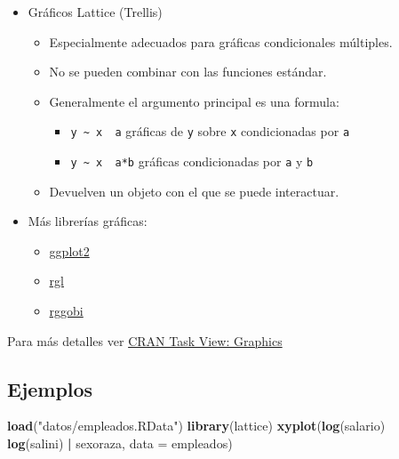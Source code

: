 \documentclass[]{book}
\newenvironment{Shaded}{\begin{snugshade}}{\end{snugshade}}
\newcommand{\DataTypeTok}[1]{\textcolor[rgb]{0.13,0.29,0.53}{#1}}
\newcommand{\KeywordTok}[1]{\textcolor[rgb]{0.13,0.29,0.53}{\textbf{#1}}}
\newcommand{\NormalTok}[1]{#1}
\newcommand{\OperatorTok}[1]{\textcolor[rgb]{0.81,0.36,0.00}{\textbf{#1}}}
\newcommand{\StringTok}[1]{\textcolor[rgb]{0.31,0.60,0.02}{#1}}
\begin{document}
\begin{itemize}
\item
  Gráficos Lattice (Trellis)

  \begin{itemize}
  \item
    Especialmente adecuados para gráficas condicionales múltiples.
  \item
    No se pueden combinar con las funciones estándar.
  \item
    Generalmente el argumento principal es una formula:

    \begin{itemize}
    \item
      \texttt{y\ \textasciitilde{}\ x\ \textbar{}\ a} gráficas de \texttt{y} sobre \texttt{x} condicionadas por \texttt{a}
    \item
      \texttt{y\ \textasciitilde{}\ x\ \textbar{}\ a*b} gráficas condicionadas por \texttt{a} y \texttt{b}
    \end{itemize}
  \item
    Devuelven un objeto con el que se puede interactuar.
  \end{itemize}
\item
  Más librerías gráficas:

  \begin{itemize}
  \item
    \href{http://had.co.nz/ggplot2}{ggplot2}
  \item
    \href{http://rgl.neoscientists.org}{rgl}
  \item
    \href{http://www.ggobi.org/rggobi}{rggobi}
  \end{itemize}
\end{itemize}

Para más detalles ver \href{http://cran.r-project.org/web/views/Graphics.html}{CRAN Task View: Graphics}

\hypertarget{ejemplos-2}{%
\subsection{Ejemplos}\label{ejemplos-2}}

\begin{Shaded}
\begin{Highlighting}[]
\KeywordTok{load}\NormalTok{(}\StringTok{"datos/empleados.RData"}\NormalTok{)}
\KeywordTok{library}\NormalTok{(lattice)}
\KeywordTok{xyplot}\NormalTok{(}\KeywordTok{log}\NormalTok{(salario) }\OperatorTok{~}\StringTok{ }\KeywordTok{log}\NormalTok{(salini) }\OperatorTok{|}\StringTok{ }\NormalTok{sexoraza, }\DataTypeTok{data =}\NormalTok{ empleados)}
\end{Highlighting}
\end{Shaded}
\end{document}
